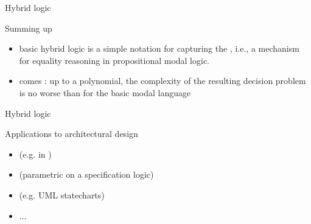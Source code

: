 \documentclass{beamer}
\begin{document}
\begin{slide}{Hybrid logic}\label{s:51a}
\small

\begin{block}{Summing up}
\begin{itemize}
\item basic hybrid logic is a simple notation for capturing  the , i.e., a mechanism for equality reasoning in propositional modal logic. 
\item comes : up to a polynomial, the complexity of the resulting decision problem is no worse than for the basic modal language
\end{itemize}
\end{block}
\end{slide}

\begin{slide}{Hybrid logic}\label{s:51b}
\small


\begin{block}{Applications to architectural design}
\begin{itemize}
\item {} (e.g. in \reo)
\item {} (parametric on a specification logic)
\item {} (e.g. UML statecharts)
\item ...
\end{itemize}
\end{block}
\begin{flushright}
\end{flushright}
\end{slide}
\end{document}
